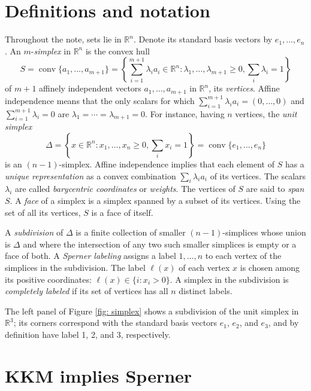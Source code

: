 \documentclass[english, 11pt]{article}
\newcommand{\conv}{\mathop{\mathrm{conv}}}
\theoremstyle{plain} %
\begin{document}
\section{Definitions and notation}

Throughout the note, sets lie in $\mathbb{R}^n$. Denote its standard basis vectors by $e_1, \ldots, e_n$. An $m$-\emph{simplex\/} in $\mathbb{R}^n$ is the convex hull
\[
\textstyle S = \conv \{a_1, \ldots, a_{m+1}\} = \left\{\sum_{i=1}^{m+1} \lambda_i a_i \in \mathbb{R}^n: \lambda_1, \ldots, \lambda_{m+1} \geq 0, \sum_i \lambda_i = 1\right\}
\]
of $m+1$ affinely independent vectors $a_1, \ldots, a_{m+1}$ in $\mathbb{R}^n$, its \emph{vertices\/}. Affine independence means that the only scalars for which $\sum_{i=1}^{m+1} \lambda_i a_i = (0, \ldots, 0)$ and $\sum_{i=1}^{m+1} \lambda_i = 0$ are $\lambda_1 = \cdots = \lambda_{m+1} = 0$. For instance, having $n$ vertices, the \emph{unit simplex\/}
\[
\textstyle \Delta = \left\{x \in \mathbb{R}^n: x_1, \ldots, x_n \geq 0, \sum_i x_i = 1\right\} = \conv \{e_1, \ldots, e_n\}
\]
is an $(n-1)$-simplex. Affine independence implies that each element of $S$ has a \emph{unique representation} as a convex combination $\sum_i \lambda_i a_i$ of its vertices. The scalars $\lambda_i$ are called \emph{barycentric coordinates\/} or \emph{weights\/}. The vertices of $S$ are said to \emph{span\/} $S$. A \emph{face\/} of a simplex is a simplex spanned by a subset of its vertices. Using the set of all its vertices, $S$ is a face of itself.

A \emph{subdivision\/} of $\Delta$ is a finite collection of smaller $(n-1)$-simplices whose union is $\Delta$ and where the intersection of any two such smaller simplices is empty or a face of both. A \emph{Sperner labeling\/} assigns a label $1, \ldots, n$ to each vertex of the simplices in the subdivision. The label $\ell(x)$ of each vertex $x$ is chosen among its positive coordinates: $\ell(x) \in \{i: x_i > 0\}$. A simplex in the subdivision is \emph{completely labeled\/} if its set of vertices has all $n$ distinct labels.

The left panel of Figure \ref{fig: simplex} shows a subdivision of the unit simplex in $\mathbb{R}^3$; its corners correspond with the standard basis vectors $e_1$, $e_2$, and $e_3$, and by definition have label 1, 2, and 3, respectively.

\section{KKM implies Sperner}
\end{document}

